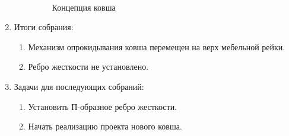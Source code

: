 \begin{enumerate}
\begin{enumerate}
	  \begin{figure}[H]
	  	\begin{minipage}[h]{0.2\linewidth}
	  		\center  
	  	\end{minipage}
	  	\begin{minipage}[h]{0.6\linewidth}
	  		\caption{Концепция ковша}
	  	\end{minipage}
	  \end{figure}
	  
    \end{enumerate}
    
	\item Итоги собрания: 
	\begin{enumerate}
	  \item Механизм опрокидывания ковша перемещен на верх мебельной рейки.
	  
	  \item Ребро жесткости не установлено.
	  
    \end{enumerate}
    
	\item Задачи для последующих собраний:
	\begin{enumerate}
	  \item Установить П-образное ребро жесткости.
	  
	  \item Начать реализацию проекта нового ковша.
	  
    \end{enumerate}     
\end{enumerate}
\fillpage